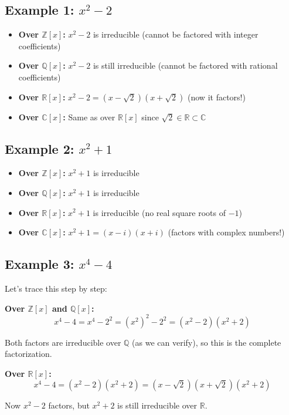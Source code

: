 \documentclass[12pt]{article}
\begin{document}
\subsection{Example 1: $x^2 - 2$}

\begin{itemize}
\item \textbf{Over $\mathbb{Z}[x]$:} $x^2 - 2$ is irreducible (cannot be factored with integer coefficients)
\item \textbf{Over $\mathbb{Q}[x]$:} $x^2 - 2$ is still irreducible (cannot be factored with rational coefficients)  
\item \textbf{Over $\mathbb{R}[x]$:} $x^2 - 2 = (x - \sqrt{2})(x + \sqrt{2})$ (now it factors!)
\item \textbf{Over $\mathbb{C}[x]$:} Same as over $\mathbb{R}[x]$ since $\sqrt{2} \in \mathbb{R} \subset \mathbb{C}$
\end{itemize}

\subsection{Example 2: $x^2 + 1$}

\begin{itemize}
\item \textbf{Over $\mathbb{Z}[x]$:} $x^2 + 1$ is irreducible
\item \textbf{Over $\mathbb{Q}[x]$:} $x^2 + 1$ is irreducible
\item \textbf{Over $\mathbb{R}[x]$:} $x^2 + 1$ is irreducible (no real square roots of $-1$)
\item \textbf{Over $\mathbb{C}[x]$:} $x^2 + 1 = (x - i)(x + i)$ (factors with complex numbers!)
\end{itemize}

\subsection{Example 3: $x^4 - 4$}

Let's trace this step by step:

\textbf{Over $\mathbb{Z}[x]$ and $\mathbb{Q}[x]$:}
$$x^4 - 4 = x^4 - 2^2 = (x^2)^2 - 2^2 = (x^2 - 2)(x^2 + 2)$$

Both factors are irreducible over $\mathbb{Q}$ (as we can verify), so this is the complete factorization.

\textbf{Over $\mathbb{R}[x]$:}
$$x^4 - 4 = (x^2 - 2)(x^2 + 2) = (x - \sqrt{2})(x + \sqrt{2})(x^2 + 2)$$

Now $x^2 - 2$ factors, but $x^2 + 2$ is still irreducible over $\mathbb{R}$.
\end{document}
